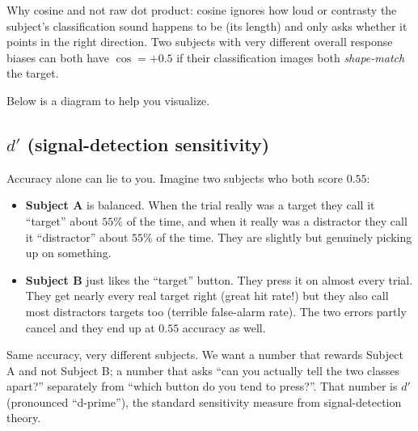 \documentclass[11pt]{article}
\begin{document}
Why cosine and not raw dot product: cosine ignores how loud or
contrasty the subject's classification sound happens to be (its
length) and only asks whether it points in the right direction. Two
subjects with very different overall response biases can both have
$\cos = +0.5$ if their classification images both \emph{shape-match}
the target.

Below is a diagram to help you visualize.

\begin{center}
\end{center}

\subsection{$d'$ (signal-detection sensitivity)}

Accuracy alone can lie to you. Imagine two subjects who both score $0.55$:
\begin{itemize}
  \item \textbf{Subject A} is balanced. When the trial really was a target they call it ``target'' about $55\%$ of the time, and when it really was a distractor they call it ``distractor'' about $55\%$ of the time. They are slightly but genuinely picking up on something.
  \item \textbf{Subject B} just likes the ``target'' button. They press it on almost every trial. They get nearly every real target right (great hit rate!) but they also call most distractors targets too (terrible false-alarm rate). The two errors partly cancel and they end up at $0.55$ accuracy as well.
\end{itemize}
Same accuracy, very different subjects. We want a number that rewards Subject A and not Subject B; a number that asks ``can you actually tell the two classes apart?'' separately from ``which button do you tend to press?''. That number is $d'$ (pronounced ``d-prime''), the standard sensitivity measure from signal-detection theory.
\end{document}
